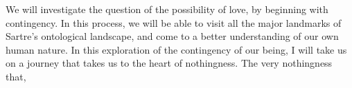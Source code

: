 We will investigate the question of the possibility of love, by beginning with contingency. In this process, we will be able to visit all the major landmarks of Sartre's ontological landscape, and come to a better understanding of our own human nature. In this exploration of the contingency of our being, I will take us on a journey that takes us to the heart of nothingness. The very nothingness that, 



%

